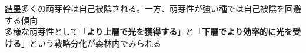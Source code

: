 \documentclass[a0, 30pt, plainboxedsections]{sciposter} %
\begin{document}
\begin{multicols}{2}
\begin{mdframed}[style=conclusion.frame]
  \vspace{0.4em}
  \normalsize{\underline{結果}多くの萌芽幹は自己被陰される。一方、萌芽性が強い種では自己被陰を回避する傾向\\
  }
  \large{\faHandLeft \vspace{0.02em} 多様な萌芽性として「\textbf{より上層で光を獲得する}」と「\textbf{下層でより効率的に光を受ける}」という戦略分化が森林内でみられる
  } %
\end{mdframed}
\end{multicols}
\begin{mdframed}[style=section.frame]
  \centering\huge\textbf{}
\end{mdframed}
\end{document}
